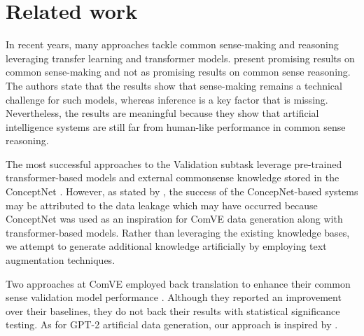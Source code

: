 \documentclass[10pt, a4paper]{article}
\begin{document}
\section{Related work}
\label{sec:rw}

In recent years, many approaches tackle common sense-making and reasoning leveraging transfer learning and transformer models. \citet{wang-etal-2019-make} present promising results on common sense-making and not as promising results on common sense reasoning. The authors state that the results show that sense-making remains a technical challenge for such models, whereas inference is a key factor that is missing. Nevertheless, the results are meaningful because they show that artificial intelligence systems are still far from human-like performance in common sense reasoning.

The most successful approaches to the Validation subtask \citep{zhang-etal-2020-cn,zhao-etal-2020-ecnu} leverage pre-trained transformer-based models and external commonsense knowledge stored in the ConceptNet \cite{conceptnet}. However, as stated by \citet{wang-etal-2020-semeval}, the success of the ConcepNet-based systems may be attributed to the data leakage which may have occurred because ConceptNet was used as an inspiration for ComVE data generation along with transformer-based models. Rather than leveraging the existing knowledge bases, we attempt to generate additional knowledge artificially by employing text augmentation techniques.

Two approaches at ComVE employed back translation to enhance their common sense validation model performance \citep{liu-etal-2020-lmve,jon-etal-2020-fit}. Although they reported an improvement over their baselines, they do not back their results with statistical significance testing. As for GPT-2 artificial data generation, our approach is inspired by \citet{kumar-etal-2020-data}.
\end{document}
